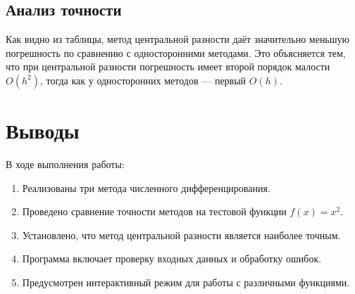 \documentclass[12pt,a4paper]{article}
\begin{document}
\subsection{Анализ точности}

Как видно из таблицы, метод центральной разности даёт значительно меньшую погрешность по сравнению с односторонними методами. Это объясняется тем, что при центральной разности погрешность имеет второй порядок малости $O(h^2)$, тогда как у односторонних методов — первый $O(h)$.

\section{Выводы}

В ходе выполнения работы:

\begin{enumerate}
    \item Реализованы три метода численного дифференцирования.
    \item Проведено сравнение точности методов на тестовой функции $f(x) = x^2$.
    \item Установлено, что метод центральной разности является наиболее точным.
    \item Программа включает проверку входных данных и обработку ошибок.
    \item Предусмотрен интерактивный режим для работы с различными функциями.
\end{enumerate}
\end{document}
